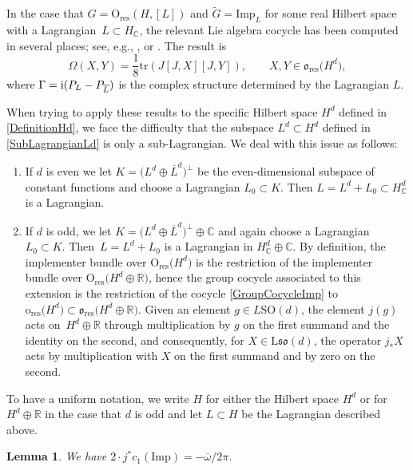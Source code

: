 \documentclass[10pt,a4paper]{amsart}
\numberwithin{equation}{section}
\newtheorem{Lemma}[Theorem]{Lemma}
\newcommand{\R}{\mathbb{R}}
\newcommand{\C}{\mathbb{C}}
\newcommand{\tr}{\mathrm{tr}}
\newcommand{\SO}{\mathrm{SO}}
\newcommand{\res}{\mathrm{res}}
\newcommand{\Imp}{\mathrm{Imp}}
\renewcommand{\O}{\mathrm{O}}
\renewcommand{\L}{\mathrm{L}}
\begin{document}
In the case that $G = \O_{\res}(H, [L])$ and $\tilde{G} = \Imp_L$ for some real Hilbert space with a Lagrangian~$L \subset H_\C$, the relevant Lie algebra cocycle has been computed in several places; see, e.g., \cite[Theorem~6.10]{Araki1}, \cite[Theorem~10.2]{NeebSemibounded} or \cite[Theorem~6]{Ottesen}.
The result is
\begin{equation}
\label{GroupCocycleImp}
 \Omega(X, Y) = \frac{1}{8} \tr(J [J, X] [J, Y]), \qquad X, Y \in \mathfrak{o}_{\res}\big(H^d\big),
\end{equation}
where $\Gamma = {\rm i}(P_{L} - P_{\overline{L}})$ is the complex structure determined by the Lagrangian $L$.

When trying to apply these results to the specific Hilbert space $H^d$ defined in \eqref{DefinitionHd}, we face the difficulty that the subspace $L^d \subset H^d$ defined in \eqref{SubLagrangianLd} is only a sub-Lagrangian.
We deal with this issue as follows:
\begin{enumerate}\itemsep=0pt
\item[(i)]
If $d$ is even we let $K = \big(L^d \oplus \overline{L}^d\big)^\perp$ be the even-dimensional subspace of constant functions and choose a Lagrangian $L_0 \subset K$.
Then $L = L^d + L_0 \subset H^d_\C$ is a Lagrangian.
\item[(ii)]
If $d$ is odd, we let $K = \big(L^d \oplus \overline{L}^d\big)^\perp \oplus \C$ and again choose a Lagrangian $L_0 \subset K$.
Then~${L = L^d + L_0}$ is a Lagrangian in $H^d_\C \oplus \C$.
By definition, the implementer bundle over $\O_{\res}\big(H^d\big)$ is the restriction of the implementer bundle over $\O_{\res}\big(H^d \oplus \R\big)$, hence the group cocycle associated to this extension is the restriction of the cocycle \eqref{GroupCocycleImp} to~$\mathrm{o}_{\res}\big(H^d\big) \subset \mathfrak{o}_{\res}\big(H^d \oplus \R\big)$.
Given an element $g \in L\SO(d)$, the element $j(g)$ acts on~$H^d \oplus \R$ through multiplication by $g$ on the first summand and the identity on the second, and consequently, for $X \in \L \mathfrak{so}(d)$, the operator $j_*X$ acts by multiplication with $X$ on the first summand and by zero on the second.
\end{enumerate}
To have a uniform notation, we write $H$ for either the Hilbert space $H^d$ or for $H^d \oplus \R$ in the case that $d$ is odd and let $L \subset H$ be the Lagrangian described above.

\begin{Lemma}\label{LemmaA4}
 We have $2 \cdot j^*c_1(\Imp) = - \overline{\omega}/2\pi$.
\end{Lemma}
\end{document}
